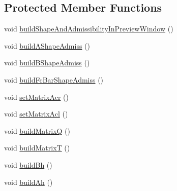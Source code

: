 \subsection*{\-Protected \-Member \-Functions}
\begin{DoxyCompactItemize}
\item 
void \hyperlink{classMIQPLinearConstraints_a2f41d99a16293718b94d17ce9ee5b59d}{build\-Shape\-And\-Admissibility\-In\-Preview\-Window} ()
\item 
void \hyperlink{classMIQPLinearConstraints_ae9b8c02ee58863d05d2aab41e780413e}{build\-A\-Shape\-Admiss} ()
\item 
void \hyperlink{classMIQPLinearConstraints_aa3752e85f1167129814b1a41d6b0198e}{build\-B\-Shape\-Admiss} ()
\item 
void \hyperlink{classMIQPLinearConstraints_a5231950d561e42e0d6590a398bec771c}{build\-Fc\-Bar\-Shape\-Admiss} ()
\item 
void \hyperlink{classMIQPLinearConstraints_ad36868550b3d1f977a67e76a44160192}{set\-Matrix\-Acr} ()
\item 
void \hyperlink{classMIQPLinearConstraints_a2985d200d8e6baba2df17abfeaca8882}{set\-Matrix\-Acl} ()
\item 
void \hyperlink{classMIQPLinearConstraints_a127e7ddd641f11d1b6137c59d80ef8b5}{build\-Matrix\-Q} ()
\item 
void \hyperlink{classMIQPLinearConstraints_addee397c47be26fd9eebbe8374c3cc30}{build\-Matrix\-T} ()
\item 
void \hyperlink{classMIQPLinearConstraints_ae6ecdf8d77474a8b099f2526d6cc0d75}{build\-Bh} ()
\item 
void \hyperlink{classMIQPLinearConstraints_a70bcc70db0ab171390d20af674e80c27}{build\-Ah} ()
\end{DoxyCompactItemize}
